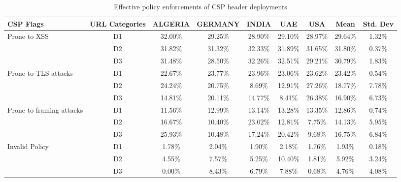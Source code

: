 \begin{table}[!ht]
    \centering
    \footnotesize
    \caption{Effective policy enforcements of CSP header deployments}
    \label{tab:sec-lot-csp}
    \begin{tabular}{l|c|c|c|c|c|c|c|c}
    \toprule
        CSP Flags & URL Categories & ALGERIA & GERMANY & INDIA & UAE & USA & Mean & Std. Dev \\ \midrule
        \multirow{3}{*}{Prone to XSS} & D1 & 32.00\% & 29.25\% & 28.90\% & 29.10\% & 28.97\% & 29.64\% & 1.32\% \\
        ~ & D2 & 31.82\% & 31.32\% & 32.33\% & 31.89\% & 31.65\% & 31.80\% & 0.37\% \\
        ~ & D3 & 31.48\% & 28.50\% & 32.26\% & 32.51\% & 29.21\% & 30.79\% & 1.83\% \\ \hline
        \multirow{3}{*}{Prone to TLS attacks} & D1 & 22.67\% & 23.77\% & 23.96\% & 23.06\% & 23.62\% & 23.42\% & 0.54\% \\
        ~ & D2 & 24.24\% & 20.75\% & 8.69\% & 12.91\% & 27.26\% & 18.77\% & 7.78\% \\
        ~ & D3 & 14.81\% & 20.11\% & 14.77\% & 8.41\% & 26.38\% & 16.90\% & 6.73\% \\ \hline
        \multirow{3}{*}{Prone to framing attacks} & D1 & 11.56\% & 12.99\% & 13.14\% & 13.28\% & 13.35\% & 12.86\% & 0.74\% \\
        ~ & D2 & 16.67\% & 10.40\% & 23.02\% & 12.81\% & 7.75\% & 14.13\% & 5.95\% \\
        ~ & D3 & 25.93\% & 10.48\% & 17.24\% & 20.42\% & 9.68\% & 16.75\% & 6.84\% \\ \hline
        \multirow{3}{*}{Invalid Policy} & D1 & 1.78\% & 2.04\% & 1.90\% & 2.18\% & 1.76\% & 1.93\% & 0.18\% \\
        ~ & D2 & 4.55\% & 7.57\% & 5.25\% & 10.40\% & 1.81\% & 5.92\% & 3.24\% \\
        ~ & D3 & 0.00\% & 8.43\% & 6.79\% & 7.88\% & 0.68\% & 4.76\% & 4.08\% \\
        \bottomrule
    \end{tabular}
\end{table}


